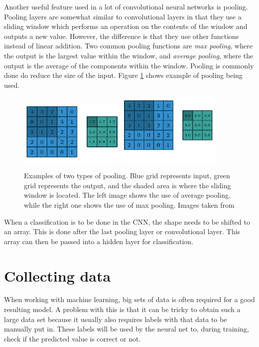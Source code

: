  
 Another useful feature used in a lot of convolutional neural networks is pooling. Pooling layers are somewhat similar to convolutional layers in that they use a sliding window which performs an operation on the contents of the window and outputs a new value. However, the difference is that they use other functions instead of linear addition. Two common pooling functions are \textit{max pooling}, where the output is the largest value within the window, and \textit{average pooling}, where the output is the average of the components within the window.  Pooling is commonly done do reduce the size of the input. Figure \ref{fig:pooling} shows example of pooling being used.
 
 \begin{figure}[hbtp]
\begin{center}
\includegraphics[width = 0.45\textwidth]{./Images/avgPool.png}
\includegraphics[width = 0.45\textwidth]{./Images/maxPool.png}
\caption{Examples of two types of pooling. Blue grid represents input, green grid represents the output, and the shaded area is where the sliding window is located. The left image shows the use of average pooling, while the right one shows the use of max pooling.
Images taken from \cite{convArit}}
\label{fig:pooling}
\end{center}
\end{figure} 
 
When a classification is to be done in the CNN, the shape needs to be shifted to an array. This is done after the last pooling layer or convolutional layer. This array can then be passed into a hidden layer for classification.


\section{Collecting data}
\label{sec:NNdata}
When working with machine learning, big sets of data is often required for a good resulting model.
A problem with this is that it can be tricky to obtain such a large data set because it usually also requires
labels with that data to be manually put in. These labels will be used by the neural net to, during training, check if
the predicted value is correct or not.

